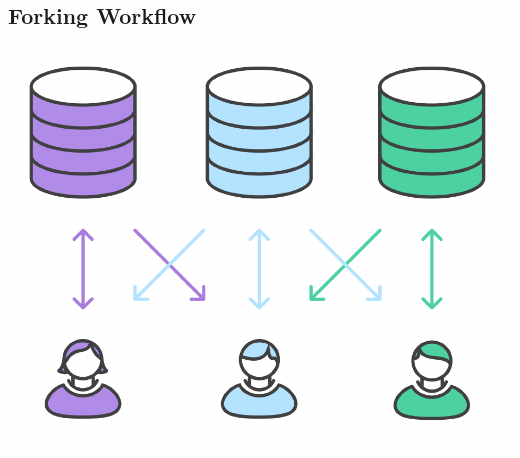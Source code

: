 \documentclass{article}
\begin{document}
\subsection{Forking Workflow}

\begin{center}
\includegraphics[scale=0.5]{figures/15.pdf}
\end{center}
\end{document}
